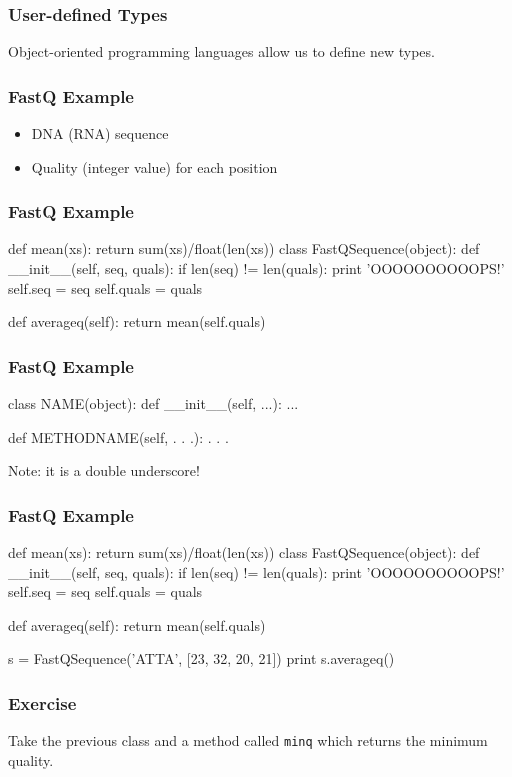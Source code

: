 \begin{frame}[fragile]
\frametitle{User-defined Types}

Object-oriented programming languages allow us to define new types.

\end{frame}

\begin{frame}[fragile]
\frametitle{FastQ Example}

\begin{itemize}
\item DNA (RNA) sequence
\item Quality (integer value) for each position
\end{itemize}

\end{frame}


\begin{frame}[fragile]
\frametitle{FastQ Example}

\begin{python}
def mean(xs):
    return sum(xs)/float(len(xs))
class FastQSequence(object):
    def __init__(self, seq, quals):
        if len(seq) != len(quals):
            print 'OOOOOOOOOOPS!'
        self.seq = seq
        self.quals = quals

    def averageq(self):
        return mean(self.quals)
\end{python}

\end{frame}

\begin{frame}[fragile]
\frametitle{FastQ Example}

\begin{python}
class NAME(object):
    def __init__(self, ...):
        ...

    def METHODNAME(self, . . .):
        . . .
\end{python}

Note: it is a \alert{double underscore}!

\end{frame}

\begin{frame}[fragile]
\frametitle{FastQ Example}

\begin{python}
def mean(xs):
    return sum(xs)/float(len(xs))
class FastQSequence(object):
    def __init__(self, seq, quals):
        if len(seq) != len(quals):
            print 'OOOOOOOOOOPS!'
        self.seq = seq
        self.quals = quals

    def averageq(self):
        return mean(self.quals)

s = FastQSequence('ATTA', [23, 32, 20, 21])
print s.averageq()
\end{python}

\end{frame}

\begin{frame}[fragile]
\frametitle{Exercise}
Take the previous class and a \alert{method} called \lstinline{minq} which
returns the minimum quality.

\end{frame}



